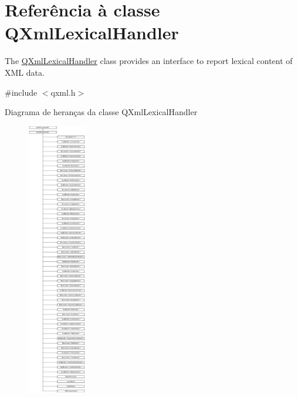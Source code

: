 \hypertarget{class_q_xml_lexical_handler}{\section{Referência à classe Q\-Xml\-Lexical\-Handler}
\label{class_q_xml_lexical_handler}
}


The \hyperlink{class_q_xml_lexical_handler}{Q\-Xml\-Lexical\-Handler} class provides an interface to report lexical content of X\-M\-L data.  




{\ttfamily \#include $<$qxml.\-h$>$}

Diagrama de heranças da classe Q\-Xml\-Lexical\-Handler\begin{figure}[H]
\begin{center}
\leavevmode
\includegraphics[height=12.000000cm]{class_q_xml_lexical_handler}
\end{center}
\end{figure}
